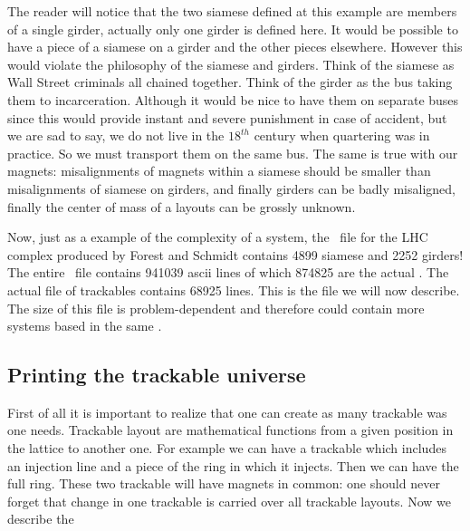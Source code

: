 The reader will notice that the two siamese defined at this example are members of a single girder, actually  only one girder is defined here. It would be possible to have a piece of a siamese on a girder and the other pieces elsewhere. However this would violate the philosophy of the siamese and girders. Think of the siamese as Wall Street criminals all chained together. Think of the girder as the bus taking them to incarceration. Although it would be nice to have them on separate buses since this would provide instant and severe punishment in case of accident, but we are sad to say, we do not live in the $18^{th}$ century when quartering was in practice. So we must  transport them on the same bus. The same is true with our magnets: misalignments of magnets within a siamese should be smaller than misalignments of siamese on girders, and finally girders can be badly misaligned, finally the center of mass of a layouts can be grossly unknown. 

Now, just as a example of the complexity of a system, the \DNA\ file for the LHC complex produced by Forest and Schmidt contains 4899 siamese and 2252 girders! The entire \DNA\ file contains 941039 ascii lines of which 874825 are the actual \DNA . The actual file of  trackables contains 68925 lines. This is the file we will now describe.  The size of this file is problem-dependent and therefore could contain more systems based in the same \DNA .

\subsection{Printing the trackable universe}

First of all it is important to realize that one can create as many trackable was one needs. Trackable layout are mathematical  functions from a given position in the lattice to another one. For example we can have a trackable which includes an injection line and a piece of the ring in which it injects. Then we can have the full ring. These   two trackable will have magnets in common: one should never forget that change in one trackable is carried over all trackable layouts. Now we describe the 


